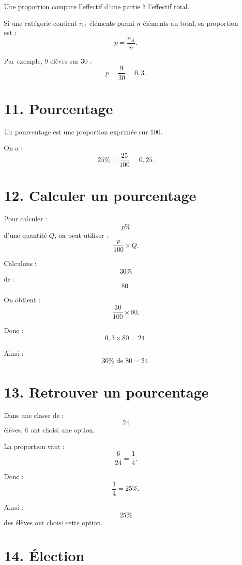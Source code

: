 Une proportion compare l'effectif d'une partie à l'effectif total.

\begin{definition}
Si une catégorie contient $n_A$ éléments parmi $n$ éléments au total, sa proportion est :
\[
\boxed{p=\dfrac{n_A}{n}}.
\]
\end{definition}

Par exemple, $9$ élèves sur $30$ :
\[
p=\dfrac9{30}=0{,}3.
\]

\section{11. Pourcentage}

Un pourcentage est une proportion exprimée sur $100$.


On a :
\[
25\%=\dfrac{25}{100}=0{,}25.
\]

\section{12. Calculer un pourcentage}

Pour calculer :
\[
p\%
\]
d'une quantité $Q$, on peut utiliser :
\[
\boxed{\dfrac{p}{100}\times Q}.
\]

\begin{exemple}
Calculons :
\[
30\%
\]
de :
\[
80.
\]

On obtient :
\[
\dfrac{30}{100}\times80.
\]

Donc :
\[
0{,}3\times80=24.
\]

Ainsi :
\[
\boxed{30\%\text{ de }80=24}.
\]
\end{exemple}

\section{13. Retrouver un pourcentage}

Dans une classe de :
\[
24
\]
élèves, $6$ ont choisi une option.

La proportion vaut :
\[
\dfrac6{24}=\dfrac14.
\]

Donc :
\[
\dfrac14=25\%.
\]

Ainsi :
\[
\boxed{25\%}
\]
des élèves ont choisi cette option.

\section{14. Élection}

